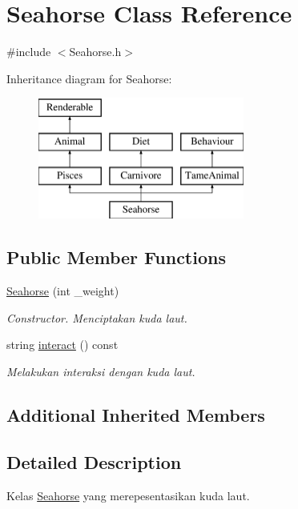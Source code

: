 \hypertarget{classSeahorse}{\section{Seahorse Class Reference}
\label{classSeahorse}
}


{\ttfamily \#include $<$Seahorse.\+h$>$}

Inheritance diagram for Seahorse\+:\begin{figure}[H]
\begin{center}
\leavevmode
\includegraphics[height=4.000000cm]{classSeahorse}
\end{center}
\end{figure}
\subsection*{Public Member Functions}
\begin{DoxyCompactItemize}
\item 
\hypertarget{classSeahorse_ad2bd21fcd3f92b38833acd5951a0d843}{\hyperlink{classSeahorse_ad2bd21fcd3f92b38833acd5951a0d843}{Seahorse} (int \+\_\+weight)}\label{classSeahorse_ad2bd21fcd3f92b38833acd5951a0d843}

\begin{DoxyCompactList}\small\item\em Constructor. Menciptakan kuda laut. \end{DoxyCompactList}\item 
string \hyperlink{classSeahorse_ae08f997f9ffc0c9c0559dc355d58fa1a}{interact} () const 
\begin{DoxyCompactList}\small\item\em Melakukan interaksi dengan kuda laut. \end{DoxyCompactList}\end{DoxyCompactItemize}
\subsection*{Additional Inherited Members}


\subsection{Detailed Description}
Kelas \hyperlink{classSeahorse}{Seahorse} yang merepesentasikan kuda laut. 

